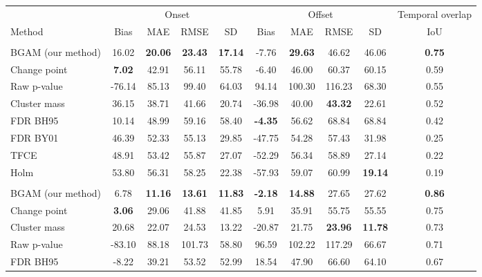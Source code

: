 \documentclass[
  doc,
  floatsintext,
  longtable,
  a4paper,
  nolmodern,
  notxfonts,
  notimes,
  colorlinks=true,linkcolor=blue,citecolor=blue,urlcolor=blue]{apa7}
\begin{document}
\begin{table}
\fontsize{9.0pt}{11.0pt}\selectfont
\begin{tabular*}{\linewidth}{@{\extracolsep{\fill}}lccccccccc}
\toprule
 & \multicolumn{4}{c}{{Onset}} & \multicolumn{4}{c}{{Offset}} & \multicolumn{1}{c}{{Temporal overlap}} \\ 
\cmidrule(lr){2-5} \cmidrule(lr){6-9} \cmidrule(lr){10-10}
Method & Bias & MAE & RMSE & SD & Bias & MAE & RMSE & SD & IoU \\ 
\midrule\addlinespace[2.5pt]
\multicolumn{10}{l}{SNR = 0.25} \\[2.5pt] 
\midrule\addlinespace[2.5pt]
BGAM (our method) & 16.02 & {\bfseries 20.06} & {\bfseries 23.43} & {\bfseries 17.14} & -7.76 & {\bfseries 29.63} & 46.62 & 46.06 & {\bfseries 0.75} \\ 
Change point & {\bfseries 7.02} & 42.91 & 56.11 & 55.78 & -6.40 & 46.00 & 60.37 & 60.15 & 0.59 \\ 
Raw p-value & -76.14 & 85.13 & 99.40 & 64.03 & 94.14 & 100.30 & 116.23 & 68.30 & 0.55 \\ 
Cluster mass & 36.15 & 38.71 & 41.66 & 20.74 & -36.98 & 40.00 & {\bfseries 43.32} & 22.61 & 0.52 \\ 
FDR BH95 & 10.14 & 48.99 & 59.16 & 58.40 & {\bfseries -4.35} & 56.62 & 68.84 & 68.84 & 0.42 \\ 
FDR BY01 & 46.39 & 52.33 & 55.13 & 29.85 & -47.75 & 54.28 & 57.43 & 31.98 & 0.25 \\ 
TFCE & 48.91 & 53.42 & 55.87 & 27.07 & -52.29 & 56.34 & 58.89 & 27.14 & 0.22 \\ 
Holm & 53.80 & 56.31 & 58.25 & 22.38 & -57.93 & 59.07 & 60.99 & {\bfseries 19.14} & 0.19 \\ 
\midrule\addlinespace[2.5pt]
\multicolumn{10}{l}{SNR = 0.5} \\[2.5pt] 
\midrule\addlinespace[2.5pt]
BGAM (our method) & 6.78 & {\bfseries 11.16} & {\bfseries 13.61} & {\bfseries 11.83} & {\bfseries -2.18} & {\bfseries 14.88} & 27.65 & 27.62 & {\bfseries 0.86} \\ 
Change point & {\bfseries 3.06} & 29.06 & 41.88 & 41.85 & 5.91 & 35.91 & 55.75 & 55.55 & 0.75 \\ 
Cluster mass & 20.68 & 22.07 & 24.53 & 13.22 & -20.87 & 21.75 & {\bfseries 23.96} & {\bfseries 11.78} & 0.73 \\ 
Raw p-value & -83.10 & 88.18 & 101.73 & 58.80 & 96.59 & 102.22 & 117.29 & 66.67 & 0.71 \\ 
FDR BH95 & -8.22 & 39.21 & 53.52 & 52.99 & 18.54 & 47.90 & 66.60 & 64.10 & 0.67 \\ 

\end{tabular*}
\end{table}
\end{document}
